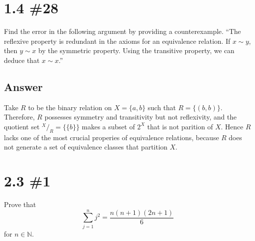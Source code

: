 \documentclass[
	12pt, %
]{fphw}
\newcommand\set[1]{\{#1\}}
\newcommand\N{\mathbb{N}}
\newcommand*\quot[2]{{^{\textstyle #1}\big/ _{\textstyle #2}}}
\begin{document}
\section*{1.4 \#28}

\begin{problem}
Find the error in the following argument by providing a counterexample. “The reflexive property is redundant in the axioms for an
equivalence relation. If $x \sim y$, then $y \sim x$ by the symmetric property. Using the transitive property, we can deduce that $x \sim x$.”
\end{problem}


\subsection*{Answer} Take $R$ to be the binary relation on $X = \set{a, b}$ such that $R = \set{(b,  b)}$. Therefore, $R$ possesses symmetry and transitivity but not reflexivity, and the quotient set $\quot{X}{R} = \set{\set{b}}$ makes a subset of $2^X$ that is not parition of $X$. Hence $R$ lacks one of the most crucial properies of equivalence relations, because $R$ does not generate a set of equivalence classes that partition $X$.


\newpage
\section*{2.3 \#1}

\begin{problem}
Prove that
$$
\sum_{j = 1}^n j^2 = \frac{n(n+1)(2n+1)}{6}
$$
for $n \in \N{}$.
\end{problem}

\end{document}
